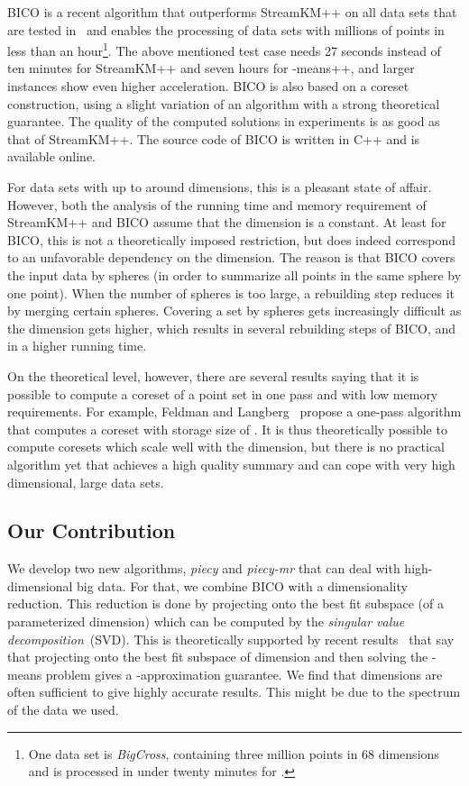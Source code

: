 \documentclass[a4paper]{scrartcl}
\begin{document}
BICO is a recent algorithm that outperforms StreamKM++ on all data sets that are tested in~\cite{AMRSLS12,FGSSS13} and enables the processing of data sets with millions of points in less than an hour\footnote{One data set is \emph{BigCross}, containing three million points in 68 dimensions and is processed in under twenty minutes for .}. The above mentioned test case needs 27 seconds instead of ten minutes for StreamKM++ and seven hours for -means++, and larger instances show even higher acceleration. BICO is also based on a coreset construction, using a slight variation of an algorithm with a strong theoretical guarantee. The quality of the computed solutions in experiments is as good as that of StreamKM++. The source code of BICO is written in C++ and is available online.

For data sets with up to around  dimensions, this is a pleasant state of affair. However, both the analysis of the running time and memory requirement of StreamKM++ and BICO assume that the dimension is a constant. At least for BICO, this is not a theoretically imposed restriction, but does indeed correspond to an unfavorable dependency on the dimension. The reason is that BICO covers the input data by spheres (in order to summarize all points in the same sphere by one point).
When the number of spheres is too large, a rebuilding step reduces it by merging certain spheres. Covering a set by spheres gets increasingly difficult as the dimension gets higher, which results in several rebuilding steps of BICO, and in a higher running time.

On the theoretical level, however, there are several results saying that it is possible to compute a coreset of a point set in one pass and with low memory requirements. For example, Feldman and Langberg~\cite{FL11} propose a one-pass algorithm that computes a coreset with storage size of . It is thus theoretically possible to compute coresets which scale well with the dimension, but there is no practical algorithm yet that achieves a high quality summary and can cope with very high dimensional, large data sets.

\subsection{Our Contribution}
We develop two new algorithms, \emph{piecy} and \emph{piecy-mr} that can deal with high-dimensional big data.
For that, we combine BICO with a dimensionality reduction. This reduction is done by projecting onto the best fit subspace (of a parameterized dimension) which can be computed by the \emph{singular value decomposition}~(SVD).
This is theoretically supported by recent results~\cite{CEMMP15,FSS13} that say that projecting onto the best fit subspace of dimension  and then solving the -means problem gives a -approximation guarantee.
We find that  dimensions are often sufficient to give highly accurate results. This might be due to the spectrum of the data we used.
\end{document}
